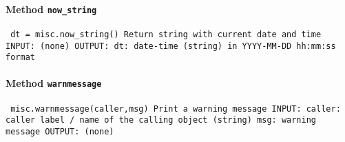\paragraph{Method \texttt{now_string}}
\vspace{1ex}
\texttt{\newline
dt = misc.now_string()\newline
\newline
Return string with current date and time\newline
\newline
INPUT:\newline
(none)\newline
\newline
OUTPUT:\newline
dt: date-time (string) in YYYY-MM-DD hh:mm:ss format\newline
\newline
}

\paragraph{Method \texttt{warnmessage}}
\vspace{1ex}
\texttt{\newline
misc.warnmessage(caller,msg)\newline
\newline
Print a warning message\newline
\newline
INPUT:\newline
caller: caller label / name of the calling object (string)\newline
msg: warning message\newline
\newline
OUTPUT:\newline
(none)\newline
\newline
}

